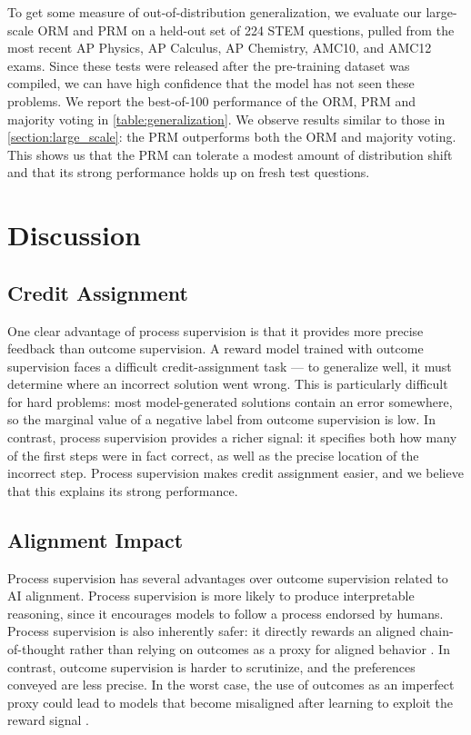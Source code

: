 To get some measure of out-of-distribution generalization, we evaluate our large-scale ORM and PRM on a held-out set of 224 STEM questions, pulled from the most recent AP Physics, AP Calculus, AP Chemistry, AMC10, and AMC12 exams. Since these tests were released after the pre-training dataset was compiled, we can have high confidence that the model has not seen these problems. We report the best-of-100 performance of the ORM, PRM and majority voting in \ref{table:generalization}. We observe results similar to those in \ref{section:large_scale}: the PRM outperforms both the ORM and majority voting. This shows us that the PRM can tolerate a modest amount of distribution shift and that its strong performance holds up on fresh test questions.

\section{Discussion} \label{section:discussion}

\subsection{Credit Assignment}

One clear advantage of process supervision is that it provides more precise feedback than outcome supervision. A reward model trained with outcome supervision faces a difficult credit-assignment task --- to generalize well, it must determine where an incorrect solution went wrong. This is particularly difficult for hard problems: most model-generated solutions contain an error somewhere, so the marginal value of a negative label from outcome supervision is low. In contrast, process supervision provides a richer signal: it specifies both how many of the first steps were in fact correct, as well as the precise location of the incorrect step. Process supervision makes credit assignment easier, and we believe that this explains its strong performance.

\subsection{Alignment Impact}

Process supervision has several advantages over outcome supervision related to AI alignment. Process supervision is more likely to produce interpretable reasoning, since it encourages models to follow a process endorsed by humans. Process supervision is also inherently safer: it directly rewards an aligned chain-of-thought rather than relying on outcomes as a proxy for aligned behavior \citep{ought2022}. In contrast, outcome supervision is harder to scrutinize, and the preferences conveyed are less precise. In the worst case, the use of outcomes as an imperfect proxy could lead to models that become misaligned after learning to exploit the reward signal \citep{uesato2022solving, cotra2022, everitt2017reinforcement}. 

